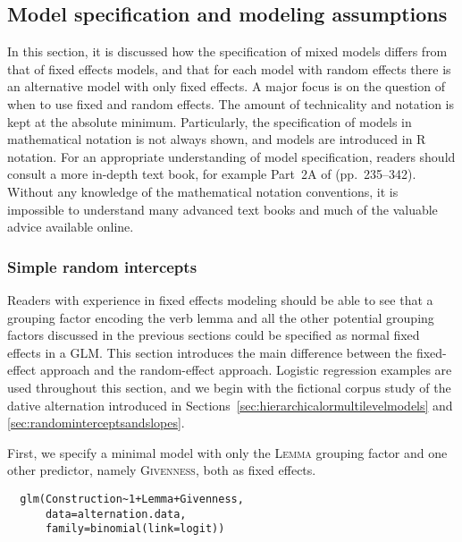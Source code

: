 \subsection{Model specification and modeling assumptions}
\label{sec:modelspecificationandmodelingassumptions}

In this section, it is discussed how the specification of mixed models differs from that of fixed effects models, and that for each model with random effects there is an alternative model with only fixed effects.
A major focus is on the question of when to use fixed and random effects.
The amount of technicality and notation is kept at the absolute minimum.
Particularly, the specification of models in mathematical notation is not always shown, and models are introduced in R notation.
For an appropriate understanding of model specification, readers should consult a more in-depth text book, for example Part~2A of \citet{GelmanHill2006} (pp.~235--342).
Without any knowledge of the mathematical notation conventions, it is impossible to understand many advanced text books and much of the valuable advice available online.

\subsubsection{Simple random intercepts}
\label{sec:simplerandomintercepts}

Readers with experience in fixed effects modeling should be able to see that a grouping factor encoding the verb lemma and all the other potential grouping factors discussed in the previous sections could be specified as normal fixed effects in a GLM.
This section introduces the main difference between the fixed-effect approach and the random-effect approach.
Logistic regression examples are used throughout this section, and we begin with the fictional corpus study of the dative alternation introduced in Sections~\ref{sec:hierarchicalormultilevelmodels} and \ref{sec:randominterceptsandslopes}.

First, we specify a minimal model with only the \textsc{Lemma} grouping factor and one other predictor, namely \textsc{Givenness}, both as fixed effects.

\begin{lstlisting}
  glm(Construction~1+Lemma+Givenness,
      data=alternation.data,
      family=binomial(link=logit))
\end{lstlisting}

